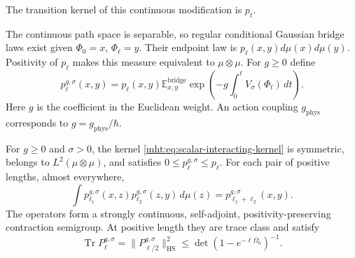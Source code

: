 The transition kernel of this continuous modification is $p_t$.

The continuous path space is separable, so regular conditional
Gaussian bridge laws exist given $\Phi_0=x$, $\Phi_\ell=y$.
Their endpoint law is $p_\ell(x,y)d\mu(x)d\mu(y)$.
Positivity of $p_\ell$ makes this measure equivalent to
$\mu\otimes\mu$. For $g\geq0$ define
\begin{equation}\label{mht:eq:scalar-interacting-kernel}
 p_\ell^{g,\sigma}(x,y)=p_\ell(x,y)
  \mathbb E_{x,y}^{\mathrm{bridge}}
       \exp\!\left(-g\int_0^\ell V_\sigma(\Phi_t)\,dt\right).
\end{equation}
Here $g$ is the coefficient in the Euclidean weight.
An action coupling $g_{\mathrm{phys}}$ corresponds to
$g=g_{\mathrm{phys}}/\hbar$.

\begin{theorem}\label{mht:thm:scalar-interacting-sewing}
For $g\geq0$ and $\sigma>0$, the kernel
\eqref{mht:eq:scalar-interacting-kernel} is symmetric, belongs
to $L^2(\mu\otimes\mu)$, and satisfies
$0\leq p_\ell^{g,\sigma}\leq p_\ell$.
For each pair of positive lengths, almost everywhere,
\begin{equation}\label{mht:eq:scalar-interacting-sewing}
 \int p_{\ell_1}^{g,\sigma}(x,z)
       p_{\ell_2}^{g,\sigma}(z,y)\,d\mu(z)
                         =p_{\ell_1+\ell_2}^{g,\sigma}(x,y).
\end{equation}
The operators form a strongly continuous, self-adjoint,
positivity-preserving contraction semigroup.
At positive length they are trace class and satisfy
\begin{equation}\label{mht:eq:scalar-interacting-trace}
 \operatorname{Tr}P_\ell^{g,\sigma}
   =\|P_{\ell/2}^{g,\sigma}\|_{\mathrm{HS}}^2
   \leq\det(1-e^{-\ell\Omega_0})^{-1}.
\end{equation}
\end{theorem}

